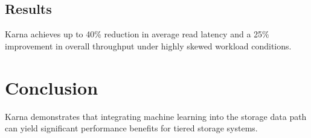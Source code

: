 \documentclass[letterpaper,twocolumn,10pt]{article}
\begin{document}
\subsection{Results}
Karna achieves up to 40\% reduction in average read latency and a 25\% improvement in overall throughput under highly skewed workload conditions.

\section{Conclusion}
Karna demonstrates that integrating machine learning into the storage data path can yield significant performance benefits for tiered storage systems.


% 
\end{document}
